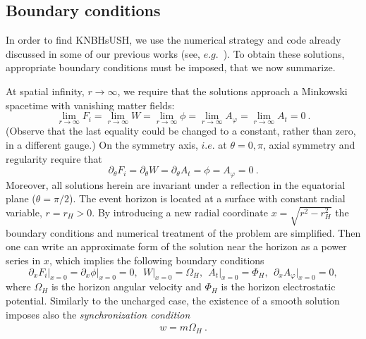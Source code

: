 \documentclass{article}
\begin{document}
\subsection{Boundary conditions}
\label{sec_bc}
In order to find KNBHsUSH, we use the numerical strategy and code already discussed in some of our previous works (see, $e.g.$~\cite{Herdeiro:2015gia,Herdeiro:2016tmi}). To obtain these solutions, appropriate boundary conditions must be imposed, that we now summarize.
  
At spatial infinity, $r\rightarrow\infty$, we require that the solutions approach a Minkowski spacetime
with vanishing matter fields:
\begin{equation}
  \lim_{r\rightarrow \infty}{F_i}=\lim_{r\rightarrow \infty}{W}=\lim_{r\rightarrow \infty}{\phi}=\lim_{r\rightarrow\infty}A_\varphi=\lim_{r\rightarrow\infty}A_t=0\ .
\end{equation}
(Observe that the last equality could be changed to a constant, rather than zero, in a different gauge.) 
%
On the symmetry axis, $i.e.$ at $\theta=0,\pi$, axial symmetry and regularity require that
\begin{equation}
\partial_\theta F_i = \partial_\theta W = \partial_\theta A_t = \phi = A_\varphi = 0\ .
\end{equation} 
%
Moreover, all solutions herein are invariant under a reflection in the equatorial plane ($\theta=\pi/2$).
The event horizon is located at a surface with constant radial variable, $r=r_H>0$.
By introducing a new radial coordinate $x=\sqrt{r^2-r_H^2}$ 
the boundary conditions and numerical treatment of the problem are simplified.
Then one can write an approximate form of the solution  near the horizon as a power series in $x$,
which implies the following boundary conditions
\begin{equation}
\partial_x F_i \big|_{x=0}= \partial_x \phi  \big|_{x=0} =  0,~~W \big|_{x=0}=\Omega_H,~~
A_t \big|_{x=0} =  \Phi_H,~~ \partial_x A_\varphi \big|_{x=0}=0 ,
\label{bch1}
\end{equation}
where $\Omega_H $ is the horizon angular velocity
and $\Phi_H$ is the horizon electrostatic potential. 
Similarly to the uncharged case, the existence of a smooth solution imposes also the
\textit{synchronization condition}
%
\begin{eqnarray}
\label{cond}
w=m\Omega_H\ .
\end{eqnarray}
%
 
\end{document}
